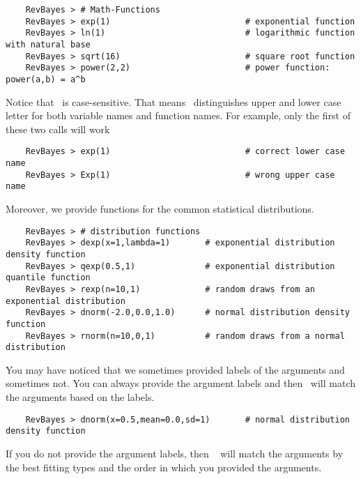 {\tt \begin{snugshade*}
\begin{lstlisting}    
    RevBayes > # Math-Functions
    RevBayes > exp(1)                           # exponential function
    RevBayes > ln(1)                            # logarithmic function with natural base
    RevBayes > sqrt(16)                         # square root function 
    RevBayes > power(2,2)                       # power function: power(a,b) = a^b
\end{lstlisting}
\end{snugshade*}}
Notice that \Rev~is case-sensitive. That means \Rev~distinguishes upper and lower case letter for both variable names and function names. For example, only the first of these two calls will work
{\tt \begin{snugshade*}
\begin{lstlisting}    
    RevBayes > exp(1)                           # correct lower case name
    RevBayes > Exp(1)                           # wrong upper case name
\end{lstlisting}
\end{snugshade*}}
Moreover, we provide functions for the common statistical distributions.
{\tt \begin{snugshade*}
\begin{lstlisting}    
    RevBayes > # distribution functions
    RevBayes > dexp(x=1,lambda=1)       # exponential distribution density function
    RevBayes > qexp(0.5,1)              # exponential distribution quantile function
    RevBayes > rexp(n=10,1)             # random draws from an exponential distribution
    RevBayes > dnorm(-2.0,0.0,1.0)      # normal distribution density function
    RevBayes > rnorm(n=10,0,1)          # random draws from a normal distribution
\end{lstlisting}
\end{snugshade*}}
You may have noticed that we sometimes provided labels of the arguments and sometimes not. 
You can always provide the argument labels and then \RevBayes~will match the arguments based on the labels.
{\tt \begin{snugshade*}
\begin{lstlisting}    
    RevBayes > dnorm(x=0.5,mean=0.0,sd=1)       # normal distribution density function
\end{lstlisting}
\end{snugshade*}}
If you do not provide the argument labels, then \RevBayes~ will match the arguments by the best fitting types and the order in which you provided the arguments.
